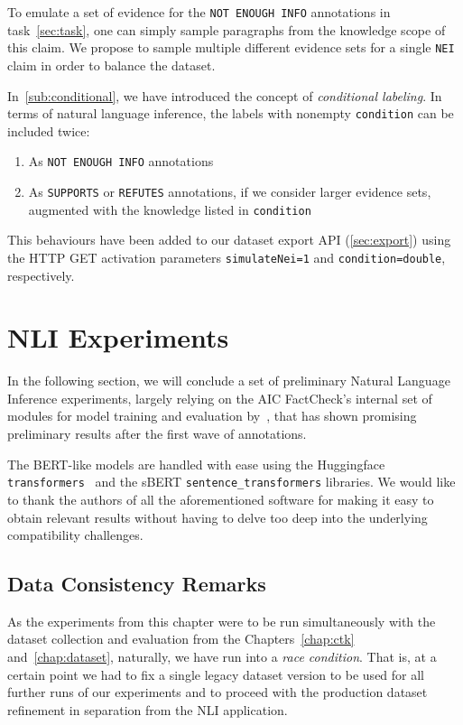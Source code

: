 To emulate a set of evidence for the \texttt{NOT ENOUGH INFO} annotations in task~\ref{sec:task}, one can simply sample paragraphs from the knowledge scope of this claim. We propose to sample multiple different evidence sets for a single \texttt{NEI} claim in order to balance the dataset.

In~\ref{sub:conditional}, we have introduced the concept of \textit{conditional labeling}. In terms of natural language inference, the labels with nonempty \texttt{condition} can be included twice:

\begin{enumerate}
    \item As \texttt{NOT ENOUGH INFO} annotations
    \item As \texttt{SUPPORTS} or \texttt{REFUTES} annotations, if we consider larger evidence sets, augmented with the knowledge listed in \texttt{condition}
\end{enumerate}

This behaviours have been added to our dataset export \textsf{API} (\ref{sec:export}) using the \textsf{HTTP GET} activation parameters \texttt{simulateNei=1} and \texttt{condition=double}, respectively.

\section{NLI Experiments}

In the following section, we will conclude a set of preliminary Natural Language Inference experiments, largely relying on the \textsf{AIC FactCheck}'s internal set of modules for model training and evaluation by~\cite{honzagit}, that has shown promising preliminary results after the first wave of annotations. 

The \textsf{BERT}-like models are handled with ease using the \textsf{Huggingface} \texttt{transformers}~\cite{huggingface} and the \textsf{sBERT} \texttt{sentence\_transformers} \cite{sentence-transformers} libraries. We would like to thank the authors of all the aforementioned software for making it easy to obtain relevant results without having to delve too deep into the underlying compatibility challenges.

\subsection{Data Consistency Remarks}
As the experiments from this chapter were to be run simultaneously with the dataset collection and evaluation from the Chapters~\ref{chap:ctk}  and~\ref{chap:dataset}, naturally, we have run into a \textit{race condition}. That is, at a certain point we had to fix a single legacy dataset version to be used for all further runs of our experiments and to proceed with the production dataset refinement in separation from the NLI application. 

